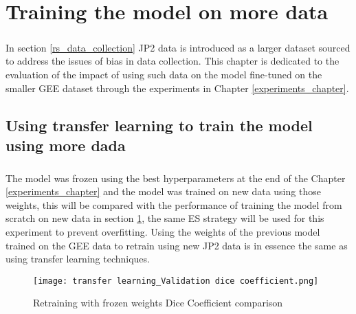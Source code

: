 \chapter{Training the model on more data} \label{new_data_train}
\paragraph{}
In section \ref{rs_data_collection} \gls{JP2} data is introduced as a larger dataset sourced to address the issues of bias in data collection. This chapter is dedicated to the evaluation of the impact of using such data on the model fine-tuned on the smaller \gls{GEE} dataset through the experiments in Chapter \ref{experiments_chapter}.

\section{Using transfer learning to train the model using more dada}
\paragraph{}
The model was frozen using the best hyperparameters at the end of the Chapter \ref{experiments_chapter} and the model was trained on new data using those weights, this will be compared with the performance of training the model from scratch on new data in section \ref{new_data_train}, the same \gls{ES} strategy will be used for this experiment to prevent overfitting. Using the weights of the previous model trained on the \gls{GEE} data to retrain using new \gls{JP2} data is in essence the same as using transfer learning techniques.

\begin{figure}[hbt!]
    \centering
    \texttt{[image: transfer learning\_Validation dice coefficient.png]}
    \caption{Retraining with frozen weights Dice Coefficient comparison}
    \label{rt_dice}
\end{figure}

